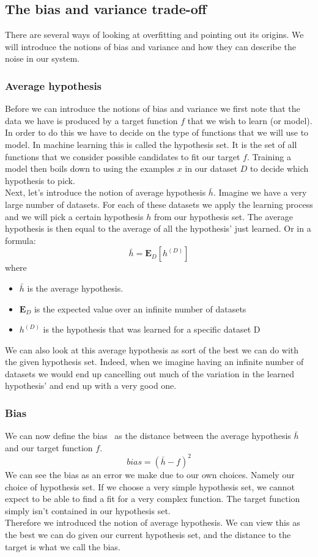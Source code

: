 \subsection{The bias and variance trade-off}
There are several ways of looking at overfitting and pointing out its origins. We will introduce the notions of bias and variance and how they can describe the noise in our system. \\
\subsubsection{Average hypothesis}
Before we can introduce the notions of bias and variance we first note that the data we have is produced by a target function $f$ that we wish to learn (or model). In order to do this we have to decide on the type of functions that we will use to model. In machine learning this is called the hypothesis set. It is the set of all functions that we consider possible candidates to fit our target $f$. Training a model then boils down to using the examples $x$ in our dataset $D$ to decide which hypothesis to pick. \\
Next, let's introduce the notion of average hypothesis $\bar{h}$. Imagine we have a very large number of datasets. For each of these datasets we apply the learning process and we will pick a certain hypothesis $h$ from our hypothesis set. The average hypothesis is then equal to the average of all the hypothesis' just learned. Or in a formula:
$$
\bar{h} = \mathbf{E}_{D}[h^{(D)}]
$$
where
\begin{itemize}
	\item $\bar{h}$ is the average hypothesis.
	\item $\mathbf{E}_{D}$ is the expected value over an infinite number of datasets
	\item $h^{(D)}$ is the hypothesis that was learned for a specific dataset D
\end{itemize}
We can also look at this average hypothesis as sort of the best we can do with the given hypothesis set. Indeed, when we imagine having an infinite number of datasets we would end up cancelling out much of the variation in the learned hypothesis' and end up with a very good one. \\
\subsubsection{Bias}
We can now define the bias~\cite{caltechmachinelearning} as the distance between the average hypothesis $\bar{h}$ and our target function $f$.
$$
bias = (\bar{h} - f)^{2}
$$
We can see the bias as an error we make due to our own choices. Namely our choice of hypothesis set. If we choose a very simple hypothesis set, we cannot expect to be able to find a fit for a very complex function. The target function simply isn't contained in our hypothesis set. \\
Therefore we introduced the notion of average hypothesis. We can view this as the best we can do given our current hypothesis set, and the distance to the target is what we call the bias.
